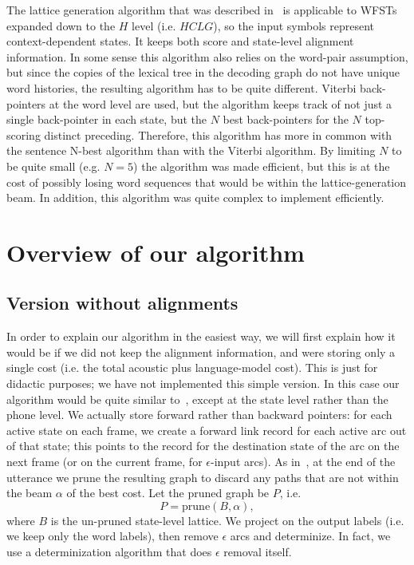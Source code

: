 \documentclass{article}
\def\HCLG{{\mathit{HCLG}}}
\begin{document}
The lattice generation algorithm that was described in~\cite{saon2005anatomy}
is applicable to WFSTs expanded down to the $H$ level (i.e. $\HCLG$),
so the input symbols represent context-dependent states.  It keeps both score and 
state-level alignment information.  In some sense this algorithm also relies
on the word-pair assumption, but since the copies of the lexical tree in the decoding
graph do not have unique word histories, the resulting algorithm has to be quite
different.  Viterbi back-pointers at the word level are used, but the algorithm keeps track
of not just a single back-pointer in each state, but the $N$ best back-pointers for the $N$ top-scoring distinct
preceding.  Therefore, this algorithm has more in common with the sentence N-best
algorithm than with the Viterbi algorithm.  By limiting $N$ to be quite small (e.g. $N{=}5$)
the algorithm was made efficient, but this is at the cost of possibly losing word sequences
that would be within the lattice-generation beam.  In addition, this algorithm was quite
complex to implement efficiently.

\section{Overview of our algorithm}
\label{sec:overview}

\subsection{Version without alignments}

In order to explain our algorithm in the easiest way, we will first explain how it would
be if we did not keep the alignment information, and were storing only a single cost
(i.e. the total acoustic plus language-model cost).  This is just for didactic purposes;
we have not implemented this simple version.
In this case our algorithm would be quite similar
to~\cite{efficient_general}, except at the state level rather than the phone level.
We actually store forward rather than backward pointers: for each active state on each
frame, we create a forward link record for each active arc out of that state; this points
to the record for the destination state of the arc on the next frame (or on 
the current frame, for $\epsilon$-input
arcs).   As in~\cite{efficient_general}, at the end of the utterance
we prune the resulting graph to discard any paths that are not within the beam $\alpha$ of the best cost. 
Let the pruned graph be $P$, i.e.
\begin{equation}
  P = \mathrm{prune}(B, \alpha),
\end{equation}
where $B$ is the un-pruned state-level lattice.
We project on the output labels (i.e. we keep only the word labels), then remove $\epsilon$
arcs and determinize.  In fact, we use a determinization algorithm that does $\epsilon$
removal itself.
\end{document}
